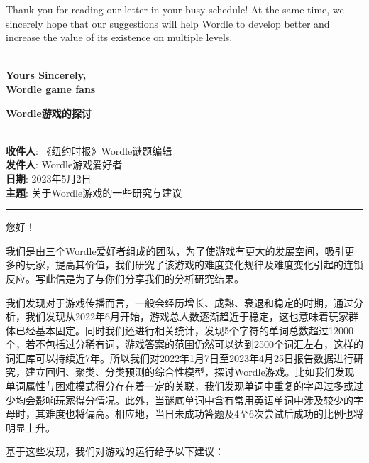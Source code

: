 \documentclass{MathModeling}
\begin{document}
	Thank you for reading our letter in your busy schedule! At the same time, we sincerely hope that our suggestions will help Wordle to develop better and increase the value of its existence on multiple levels.

	~\\
	\noindent \textbf{Yours Sincerely,}\\
	\noindent \textbf{Wordle game fans}\\

	\newpage
	\centerline{{\Large \textbf{Wordle游戏的探讨}}}
	~\\
	\noindent \textbf{收件人}: 《纽约时报》Wordle谜题编辑\\
	\noindent \textbf{发件人}: Wordle游戏爱好者\\
	\noindent \textbf{日期}: 2023年5月2日\\
	\noindent \textbf{主题}: 关于Wordle游戏的一些研究与建议\\
	\noindent\rule{\textwidth}{1.2pt}

	{\heiti 您好！}

	我们是由三个Wordle爱好者组成的团队，为了使游戏有更大的发展空间，吸引更多的玩家，提高其价值，我们研究了该游戏的难度变化规律及难度变化引起的连锁反应。写此信是为了与你们分享我们的分析研究结果。

	我们发现对于游戏传播而言，一般会经历增长、成熟、衰退和稳定的时期，通过分析，我们发现从2022年6月开始，游戏总人数逐渐趋近于稳定，这也意味着玩家群体已经基本固定。同时我们还进行相关统计，发现5个字符的单词总数超过12000个，若不包括过分稀有词，游戏答案的范围仍然可以达到2500个词汇左右，这样的词汇库可以持续近7年。所以我们对2022年1月7日至2023年4月25日报告数据进行研究，建立回归、聚类、分类预测的综合性模型，探讨Wordle游戏。比如我们发现单词属性与困难模式得分存在着一定的关联，我们发现单词中重复的字母过多或过少均会影响玩家得分情况。此外，当谜底单词中含有常用英语单词中涉及较少的字母时，其难度也将偏高。相应地，当日未成功答题及4至6次尝试后成功的比例也将明显上升。

	基于这些发现，我们对游戏的运行给予以下建议：
\end{document}
